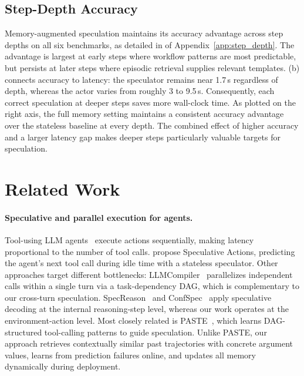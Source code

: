 \documentclass{article}
\begin{document}
\subsection{Step-Depth Accuracy}
\label{sec:step_depth}
Memory-augmented speculation maintains its accuracy advantage across step depths on all six benchmarks, as detailed in  of Appendix~\ref{app:step_depth}. The advantage is largest at early steps where workflow patterns are most predictable, but persists at later steps where episodic retrieval supplies relevant templates. (b) connects accuracy to latency: the speculator remains near 1.7\,s regardless of depth, whereas the actor varies from roughly 3 to 9.5\,s. Consequently, each correct speculation at deeper steps saves more wall-clock time. As plotted on the right axis, the full memory setting maintains a consistent accuracy advantage over the stateless baseline at every depth. The combined effect of higher accuracy and a larger latency gap makes deeper steps particularly valuable targets for speculation.


\section{Related Work}
\label{sec:related}

\paragraph{Speculative and parallel execution for agents.}
\label{sec:related:spec}
Tool-using LLM agents~\citep{yao2023react,schick2023toolformer,wang2024opendevin} execute actions sequentially, making latency proportional to the number of tool calls. \citet{ye2025speculative} propose Speculative Actions, predicting the agent's next tool call during idle time with a stateless speculator. Other approaches target different bottlenecks: LLMCompiler~\citep{kim2024llm} parallelizes independent calls within a single turn via a task-dependency DAG, which is complementary to our cross-turn speculation. SpecReason~\citep{pan2025specreason} and ConfSpec~\citep{liu2026confspec} apply speculative decoding at the internal reasoning-step level, whereas our work operates at the environment-action level. Most closely related is PASTE~\citep{sui2026paste}, which learns DAG-structured tool-calling patterns to guide speculation. Unlike PASTE, our approach retrieves contextually similar past trajectories with concrete argument values, learns from prediction failures online, and updates all memory dynamically during deployment.
\end{document}
